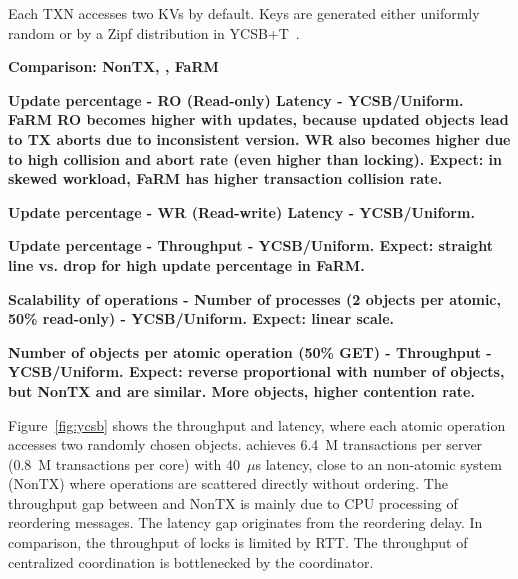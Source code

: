 Each TXN accesses two KVs by default.
Keys are generated either uniformly random or by a Zipf distribution in YCSB+T~\cite{dey2014ycsbt}.

\textbf{Comparison: NonTX, \sys{}, FaRM}

\textbf{Update percentage - RO (Read-only) Latency - YCSB/Uniform. FaRM RO becomes higher with updates, because updated objects lead to TX aborts due to inconsistent version. WR also becomes higher due to high collision and abort rate (even higher than locking). Expect: in skewed workload, FaRM has higher transaction collision rate.}

\textbf{Update percentage - WR (Read-write) Latency - YCSB/Uniform.}

\textbf{Update percentage - Throughput - YCSB/Uniform. Expect: straight line vs. drop for high update percentage in FaRM.}

\textbf{Scalability of operations - Number of processes (2 objects per atomic, 50\% read-only) - YCSB/Uniform. Expect: linear scale.}

\textbf{Number of objects per atomic operation (50\% GET) - Throughput - YCSB/Uniform. Expect: reverse proportional with number of objects, but NonTX and \sys{} are similar. More objects, higher contention rate.}




Figure~\ref{fig:ycsb} shows the throughput and latency, where each atomic operation accesses two randomly chosen objects.
\sys achieves 6.4~M transactions per server (0.8~M transactions per core) with 40~$\mu$s latency, close to an non-atomic system (NonTX) where operations are scattered directly without ordering.
The throughput gap between \sys and NonTX is mainly due to CPU processing of reordering messages.
The latency gap originates from the reordering delay.
In comparison, the throughput of locks is limited by RTT.
The throughput of centralized coordination is bottlenecked by the coordinator.

